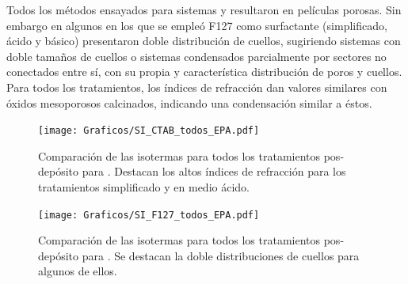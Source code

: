 		Todos los métodos ensayados para sistemas \pdmF\space y \pdmC resultaron en películas porosas. Sin embargo en algunos en los que se empleó F127 como surfactante (simplificado, ácido y básico) presentaron doble distribución de cuellos, sugiriendo sistemas con doble tamaños de cuellos o sistemas condensados parcialmente por sectores no conectados entre sí, con su propia y característica distribución de poros y cuellos. Para todos los tratamientos, los índices de refracción dan valores similares con óxidos mesoporosos calcinados, indicando una condensación similar a éstos. 


			\begin{figure}[bh!]
		 	   	   \begin{center}
		 	   	   \texttt{[image: Graficos/SI\_CTAB\_todos\_EPA.pdf]}
			   	   \caption[Comparación PEA tratamientos alternativos (CTAB)]{Comparación de las isotermas para todos los tratamientos pos-depósito para \pdmC\space. Destacan los altos índices de refracción para los tratamientos simplificado y en medio ácido.}
				   \label{fig:todos_EPA_CTAB}	
				   \end{center}
				   \end{figure}
			
			\begin{figure}[th!]
		 	   	   \begin{center}
		 	   	   \texttt{[image: Graficos/SI\_F127\_todos\_EPA.pdf]}
			   	   \caption[Comparación PEA tratamientos alternativos (F127)]{Comparación de las isotermas para todos los tratamientos pos-depósito para \pdmF\space. Se destacan la doble distribuciones de cuellos para algunos de ellos.}
				   \label{fig:todos_EPA_F127}	
				   \end{center}
				   \end{figure}	

